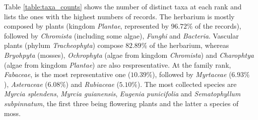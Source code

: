 Table \ref{table:taxa_counts} shows the number of distinct taxa at each rank and lists the ones with the highest numbers of records.
The herbarium is mostly composed by plants (kingdom \textit{Plantae}, represented by $96.72\%$ of the records), followed by \textit{Chromista} (including some algae), \textit{Funghi} and \textit{Bacteria}.
Vascular plants (phylum \textit{Tracheophyta}) compose $82.89\%$ of the herbarium, whereas \textit{Bryohpyta} (mosses), \textit{Ochrophyta} (algae from kingdom \textit{Chromista}) and \textit{Charophtya} (algae from kingdom \textit{Plantae}) are also respresentative.
At the family rank, \textit{Fabaceae}, is the most representative one ($10.39\%$), followed by \textit{Myrtaceae} ($6.93\%$), \textit{Asteraceae} ($6.08\%$) and \textit{Rubiaceae} ($5.10\%$). 
The most collected species are \textit{Myrcia splendens}, \textit{Myrcia guianensis}, \textit{Eugenia punicifolia} and \textit{Sematophyllum subpinnatum}, the first three being flowering plants and the latter a species of moss.

